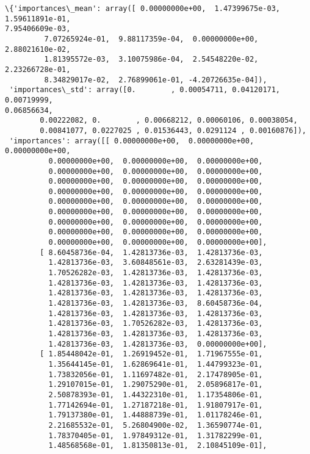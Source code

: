 \documentclass[11pt]{article}
\makeatletter
\newcommand{\boxspacing}{\kern\kvtcb@left@rule\kern\kvtcb@boxsep}
\newcommand{\prompt}[4]{
        {\ttfamily\llap{{\color{#2}[#3]:\hspace{3pt}#4}}\vspace{-\baselineskip}}
    }
\makeatother
\begin{document}
            \begin{tcolorbox}[breakable, size=fbox, boxrule=.5pt, pad at break*=1mm, opacityfill=0]
\prompt{Out}{outcolor}{153}{\boxspacing}
\begin{Verbatim}[commandchars=\\\{\}]
\{'importances\_mean': array([ 0.00000000e+00,  1.47399675e-03,  1.59611891e-01,
7.95406609e-03,
         7.07265924e-01,  9.88117359e-04,  0.00000000e+00,  2.88021610e-02,
         1.81395572e-03,  3.10075986e-04,  2.54548220e-02,  2.23266728e-01,
         8.34829017e-02,  2.76899061e-01, -4.20726635e-04]),
 'importances\_std': array([0.        , 0.00054711, 0.04120171, 0.00719999,
0.06856634,
        0.00222082, 0.        , 0.00668212, 0.00060106, 0.00038054,
        0.00841077, 0.0227025 , 0.01536443, 0.0291124 , 0.00160876]),
 'importances': array([[ 0.00000000e+00,  0.00000000e+00,  0.00000000e+00,
          0.00000000e+00,  0.00000000e+00,  0.00000000e+00,
          0.00000000e+00,  0.00000000e+00,  0.00000000e+00,
          0.00000000e+00,  0.00000000e+00,  0.00000000e+00,
          0.00000000e+00,  0.00000000e+00,  0.00000000e+00,
          0.00000000e+00,  0.00000000e+00,  0.00000000e+00,
          0.00000000e+00,  0.00000000e+00,  0.00000000e+00,
          0.00000000e+00,  0.00000000e+00,  0.00000000e+00,
          0.00000000e+00,  0.00000000e+00,  0.00000000e+00,
          0.00000000e+00,  0.00000000e+00,  0.00000000e+00],
        [ 8.60458736e-04,  1.42813736e-03,  1.42813736e-03,
          1.42813736e-03,  3.60848561e-03,  2.63281439e-03,
          1.70526282e-03,  1.42813736e-03,  1.42813736e-03,
          1.42813736e-03,  1.42813736e-03,  1.42813736e-03,
          1.42813736e-03,  1.42813736e-03,  1.42813736e-03,
          1.42813736e-03,  1.42813736e-03,  8.60458736e-04,
          1.42813736e-03,  1.42813736e-03,  1.42813736e-03,
          1.42813736e-03,  1.70526282e-03,  1.42813736e-03,
          1.42813736e-03,  1.42813736e-03,  1.42813736e-03,
          1.42813736e-03,  1.42813736e-03,  0.00000000e+00],
        [ 1.85448042e-01,  1.26919452e-01,  1.71967555e-01,
          1.35644145e-01,  1.62869641e-01,  1.44799323e-01,
          1.73832056e-01,  1.11697482e-01,  2.17478905e-01,
          1.29107015e-01,  1.29075290e-01,  2.05896817e-01,
          2.50878393e-01,  1.44322310e-01,  1.17354806e-01,
          1.77142694e-01,  1.27187218e-01,  1.91807917e-01,
          1.79137380e-01,  1.44888739e-01,  1.01178246e-01,
          2.21685532e-01,  5.26804900e-02,  1.36590774e-01,
          1.78370405e-01,  1.97849312e-01,  1.31782299e-01,
          1.48568568e-01,  1.81350813e-01,  2.10845109e-01],

\end{Verbatim}
\end{tcolorbox}
\end{document}
